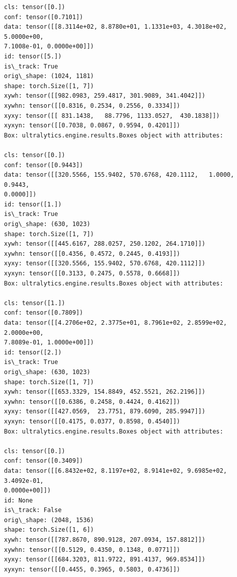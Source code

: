 \documentclass[11pt]{article}
\begin{document}
\begin{tcolorbox}[breakable, size=fbox, boxrule=1pt, pad at break*=1mm,colback=cellbackground, colframe=cellborder]
\begin{Verbatim}[commandchars=\\\{\}]
cls: tensor([0.])
conf: tensor([0.7101])
data: tensor([[8.3114e+02, 8.8780e+01, 1.1331e+03, 4.3018e+02, 5.0000e+00,
7.1008e-01, 0.0000e+00]])
id: tensor([5.])
is\_track: True
orig\_shape: (1024, 1181)
shape: torch.Size([1, 7])
xywh: tensor([[982.0983, 259.4817, 301.9089, 341.4042]])
xywhn: tensor([[0.8316, 0.2534, 0.2556, 0.3334]])
xyxy: tensor([[ 831.1438,   88.7796, 1133.0527,  430.1838]])
xyxyn: tensor([[0.7038, 0.0867, 0.9594, 0.4201]])
Box: ultralytics.engine.results.Boxes object with attributes:

cls: tensor([0.])
conf: tensor([0.9443])
data: tensor([[320.5566, 155.9402, 570.6768, 420.1112,   1.0000,   0.9443,
0.0000]])
id: tensor([1.])
is\_track: True
orig\_shape: (630, 1023)
shape: torch.Size([1, 7])
xywh: tensor([[445.6167, 288.0257, 250.1202, 264.1710]])
xywhn: tensor([[0.4356, 0.4572, 0.2445, 0.4193]])
xyxy: tensor([[320.5566, 155.9402, 570.6768, 420.1112]])
xyxyn: tensor([[0.3133, 0.2475, 0.5578, 0.6668]])
Box: ultralytics.engine.results.Boxes object with attributes:

cls: tensor([1.])
conf: tensor([0.7809])
data: tensor([[4.2706e+02, 2.3775e+01, 8.7961e+02, 2.8599e+02, 2.0000e+00,
7.8089e-01, 1.0000e+00]])
id: tensor([2.])
is\_track: True
orig\_shape: (630, 1023)
shape: torch.Size([1, 7])
xywh: tensor([[653.3329, 154.8849, 452.5521, 262.2196]])
xywhn: tensor([[0.6386, 0.2458, 0.4424, 0.4162]])
xyxy: tensor([[427.0569,  23.7751, 879.6090, 285.9947]])
xyxyn: tensor([[0.4175, 0.0377, 0.8598, 0.4540]])
Box: ultralytics.engine.results.Boxes object with attributes:

cls: tensor([0.])
conf: tensor([0.3409])
data: tensor([[6.8432e+02, 8.1197e+02, 8.9141e+02, 9.6985e+02, 3.4092e-01,
0.0000e+00]])
id: None
is\_track: False
orig\_shape: (2048, 1536)
shape: torch.Size([1, 6])
xywh: tensor([[787.8670, 890.9128, 207.0934, 157.8812]])
xywhn: tensor([[0.5129, 0.4350, 0.1348, 0.0771]])
xyxy: tensor([[684.3203, 811.9722, 891.4137, 969.8534]])
xyxyn: tensor([[0.4455, 0.3965, 0.5803, 0.4736]])
    \end{Verbatim}
\end{tcolorbox}
\end{document}
